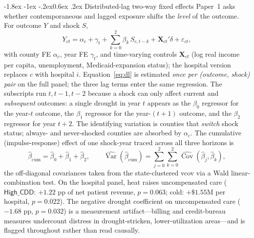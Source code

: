 \documentclass[11pt]{article}
\makeatletter
\renewcommand\subsection{\@startsection{subsection}{2}{\z@}%
  {-1.8ex \@plus -1ex \@minus -.2ex}{0.6ex \@plus .2ex}%
  {\normalfont\normalsize\bfseries}}
\makeatother
\begin{document}
\subsection{Distributed-lag two-way fixed effects}
Paper~1 asks whether contemporaneous and lagged exposure shifts the \emph{level} of
the outcome. For outcome $Y$ and shock $S$,
\begin{equation}
Y_{ct}=\alpha_c+\gamma_t+\sum_{k=0}^{2}\beta_k\,S_{c,t-k}
        +\mathbf{X}_{ct}'\delta+\varepsilon_{ct},
\label{eq:dl}
\end{equation}
with county FE $\alpha_c$, year FE $\gamma_t$, and time-varying controls
$\mathbf{X}_{ct}$ (log real income per capita, unemployment, Medicaid-expansion
status); the hospital version replaces $c$ with hospital $i$. Equation~\eqref{eq:dl}
is estimated \emph{once per (outcome, shock) pair} on the full panel; the three lag
terms enter the same regression. The subscripts run $t,t-1,t-2$ because a shock can
only affect current and \emph{subsequent} outcomes: a single drought in year $t$
appears as the $\beta_0$ regressor for the year-$t$ outcome, the $\beta_1$ regressor
for the year-$(t{+}1)$ outcome, and the $\beta_2$ regressor for year $t{+}2$. The
identifying variation is counties that \emph{switch} shock status; always- and
never-shocked counties are absorbed by $\alpha_c$. The cumulative (impulse-response)
effect of one shock-year traced across all three horizons is
\begin{equation}
\hat\beta_{\mathrm{cum}}=\hat\beta_0+\hat\beta_1+\hat\beta_2,
\qquad
\widehat{\operatorname{Var}}(\hat\beta_{\mathrm{cum}})
   =\sum_{j=0}^{2}\sum_{k=0}^{2}\widehat{\operatorname{Cov}}(\hat\beta_j,\hat\beta_k),
\label{eq:cum}
\end{equation}
the off-diagonal covariances taken from the state-clustered vcov via a Wald
linear-combination test. On the hospital panel, heat raises uncompensated care
($\textsf{High\_CDD}$: $+1.22$ pp of net patient revenue, $p=0.063$; cold:
$+\$1.55$M per hospital, $p=0.022$). The negative drought coefficient on
uncompensated care ($-1.68$ pp, $p=0.032$) is a measurement artifact---billing and
credit-bureau measures undercount distress in drought-stricken, lower-utilization
areas---and is flagged throughout rather than read causally.
\end{document}
